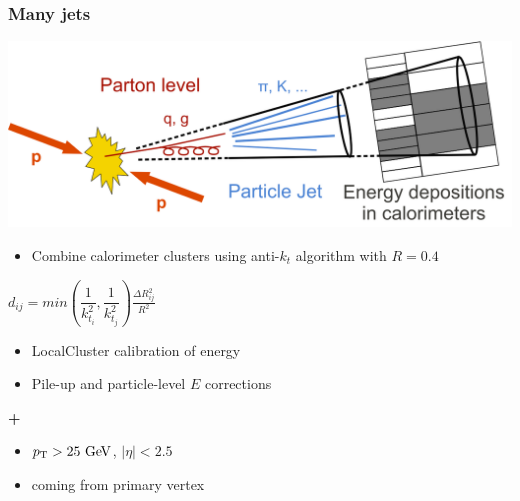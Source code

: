 \begin{frame}\frametitle{Many jets}
\centering\footnotesize

\begin{minipage}{.5\textwidth}\centering

\includegraphics[width=.78\textwidth]{pics/Sketch_PartonParticleCaloJet.png}\\

\begin{itemize}
\item Combine calorimeter clusters using anti-$k_t$ algorithm with $R=0.4$
\end{itemize}
$d_{ij}=min(\dfrac{1}{k_{t_i}^{2}},\dfrac{1}{k_{t_j}^{2}})\frac{\Delta R_{ij}^{2}}{R^{2}}$
\begin{itemize}
\item LocalCluster calibration of energy
\item Pile-up and particle-level $E$ corrections
\end{itemize}
{\cccolor \bfseries +}\\
\begin{itemize}
\item $\pt>25\gev$, $|\eta|<2.5$
\item coming from primary vertex
\end{itemize}


\end{minipage}\begin{minipage}{.5\textwidth}\centering


\end{minipage}
\end{frame}
